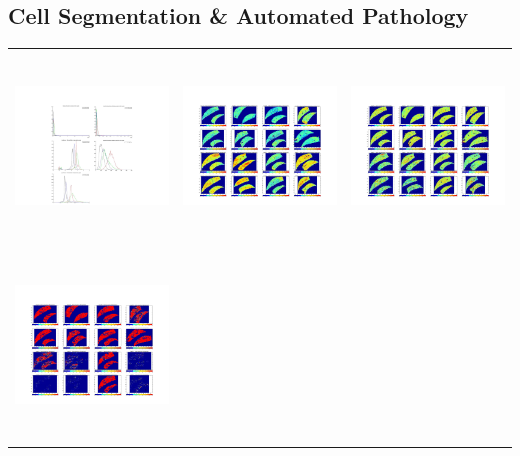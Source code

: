 \subsection{Cell Segmentation \& Automated Pathology}

\begin{tabular}{ |c|c|c| }
\includegraphics[width=5.0cm,height=5.0cm]{images/MachineVision/MachineVision_Pathology_ExampleSlides_Page_03.jpg} &
\includegraphics[width=5.0cm,height=5.0cm]{images/MachineVision/MachineVision_Pathology_ExampleSlides_Page_05.jpg} &
\includegraphics[width=5.0cm,height=5.0cm]{images/MachineVision/MachineVision_Pathology_ExampleSlides_Page_06.jpg} \\
\includegraphics[width=5.0cm,height=5.0cm]{images/MachineVision/MachineVision_Pathology_ExampleSlides_Page_07.jpg} &

\end{tabular}

